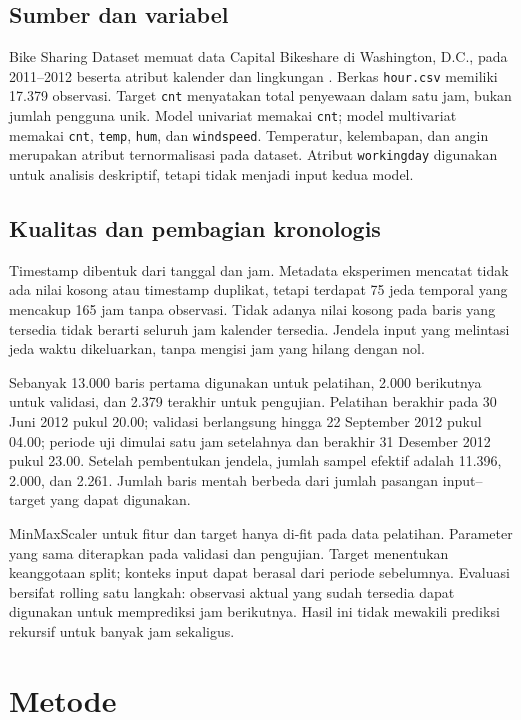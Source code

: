 \documentclass[10pt,conference]{IEEEtran}
\begin{document}
\subsection{Sumber dan variabel}
Bike Sharing Dataset memuat data Capital Bikeshare di Washington, D.C., pada 2011--2012 beserta atribut kalender dan lingkungan \cite{dataset}. Berkas \texttt{hour.csv} memiliki 17.379 observasi. Target \texttt{cnt} menyatakan total penyewaan dalam satu jam, bukan jumlah pengguna unik. Model univariat memakai \texttt{cnt}; model multivariat memakai \texttt{cnt}, \texttt{temp}, \texttt{hum}, dan \texttt{windspeed}. Temperatur, kelembapan, dan angin merupakan atribut ternormalisasi pada dataset. Atribut \texttt{workingday} digunakan untuk analisis deskriptif, tetapi tidak menjadi input kedua model.

\subsection{Kualitas dan pembagian kronologis}
Timestamp dibentuk dari tanggal dan jam. Metadata eksperimen mencatat tidak ada nilai kosong atau timestamp duplikat, tetapi terdapat 75 jeda temporal yang mencakup 165 jam tanpa observasi. Tidak adanya nilai kosong pada baris yang tersedia tidak berarti seluruh jam kalender tersedia. Jendela input yang melintasi jeda waktu dikeluarkan, tanpa mengisi jam yang hilang dengan nol.

Sebanyak 13.000 baris pertama digunakan untuk pelatihan, 2.000 berikutnya untuk validasi, dan 2.379 terakhir untuk pengujian. Pelatihan berakhir pada 30 Juni 2012 pukul 20.00; validasi berlangsung hingga 22 September 2012 pukul 04.00; periode uji dimulai satu jam setelahnya dan berakhir 31 Desember 2012 pukul 23.00. Setelah pembentukan jendela, jumlah sampel efektif adalah 11.396, 2.000, dan 2.261. Jumlah baris mentah berbeda dari jumlah pasangan input--target yang dapat digunakan.

MinMaxScaler untuk fitur dan target hanya di-fit pada data pelatihan. Parameter yang sama diterapkan pada validasi dan pengujian. Target menentukan keanggotaan split; konteks input dapat berasal dari periode sebelumnya. Evaluasi bersifat rolling satu langkah: observasi aktual yang sudah tersedia dapat digunakan untuk memprediksi jam berikutnya. Hasil ini tidak mewakili prediksi rekursif untuk banyak jam sekaligus.

\section{Metode}
\end{document}

